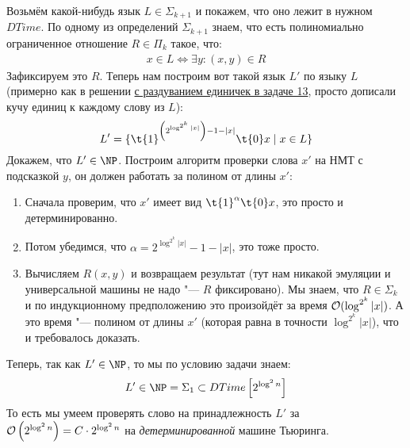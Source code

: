 		Возьмём какой-нибудь язык $L \in \Sigma_{k+1}$ и покажем, что оно лежит в нужном $DTime$.
		По одному из определений $\Sigma_{k+1}$ знаем, что есть полиномиально ограниченное отношение
		$R \in \Pi_k$ такое, что:
		\begin{gather*}
			x \in L \iff \exists y \colon (x, y) \in R
		\end{gather*}
		Зафиксируем это $R$.
		Теперь нам построим вот такой язык $L'$ по языку $L$ (примерно как в решении
		\hyperref[prob13_sol2]{с раздуванием единичек в задаче 13}, просто дописали кучу единиц к
		каждому слову из $L$):
		\[
			L' = \{
				\t{1}^{\left(2^{\log^{2^k} |x|}\right) - 1 - |x|}
				\t{0}
				x
				\mid
				x \in L
			\}
		\]
		Докажем, что $L' \in \NP$.
		Построим алгоритм проверки слова $x'$ на НМТ с подсказкой $y$, он должен работать за полином
		от длины $x'$:
		\begin{enumerate}
			\item Сначала проверим, что $x'$ имеет вид $\t{1}^\alpha \t{0}x$, это просто и детерминированно.
			\item Потом убедимся, что $\alpha = 2^{\log^{2^k} |x|} - 1 - |x|$, это тоже просто.
			\item
				Вычисляем $R(x, y)$ и возвращаем результат (тут нам никакой эмуляции и универсальной машины не надо "--- $R$ фиксировано).
				Мы знаем, что $R \in \Sigma_k$ и по индукционному предположению это произойдёт за время $\mathcal O(\log^{2^k} |x|)$.
				А это время "--- полином от длины $x'$ (которая равна в точности $\log^{2^k} |x|$), что и требовалось доказать.
		\end{enumerate}
		Теперь, так как $L' \in \NP$, то мы по условию задачи знаем:
		\[ L' \in \NP = \Sigma_1 \subset DTime\left[2^{\log^2 n}\right] \]
		То есть мы умеем проверять слово на принадлежность $L'$ за $\mathcal O\left(2^{\log^2n}\right)=C\cdot 2^{\log^2n}$ на \textit{детерминированной} машине Тьюринга.

